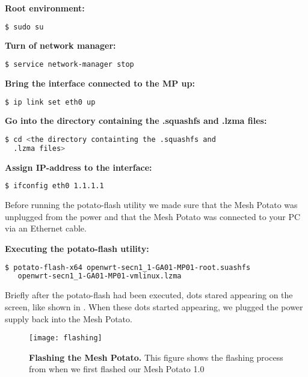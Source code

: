\begin{framed}
\noindent \textbf{Root environment:} 
\begin{lstlisting}[language=bash]
  $ sudo su
\end{lstlisting}

\noindent \textbf{Turn of network manager:}
\begin{lstlisting}[language=bash]
  $ service network-manager stop
\end{lstlisting}

\noindent \textbf{Bring the interface connected to the MP up:}
\begin{lstlisting}[language=bash]
  $ ip link set eth0 up
\end{lstlisting}

\noindent \textbf{Go into the directory containing the .squashfs and .lzma files:}
\begin{lstlisting}[language=bash]
  $ cd <the directory containting the .squashfs and 
  .lzma files>
\end{lstlisting}

\noindent \textbf{Assign IP-address to the interface:}
\begin{lstlisting}[language=bash]
  $ ifconfig eth0 1.1.1.1
\end{lstlisting}

Before running the potato-flash utility we made sure that the Mesh Potato was unplugged from the power and that the Mesh Potato was connected to your PC via an Ethernet cable. 

\noindent \textbf{Executing the potato-flash utility:}
\begin{lstlisting}[language=bash]
  $ potato-flash-x64 openwrt-secn1_1-GA01-MP01-root.suashfs 
   openwrt-secn1_1-GA01-MP01-vmlinux.lzma
\end{lstlisting}
\end{framed}

Briefly after the potato-flash had been executed, dots stared appearing on the screen, like shown in . When these dots started appearing, we plugged the power supply back into the Mesh Potato. 

\begin{figure}[t]
  \centering
      \texttt{[image: flashing]}
  \caption [Flashing the Mesh Potato]{\textbf{Flashing the Mesh Potato.} This figure shows the flashing process from when we first flashed our Mesh Potato 1.0}
  \label{fig:flashing}
\end{figure}


